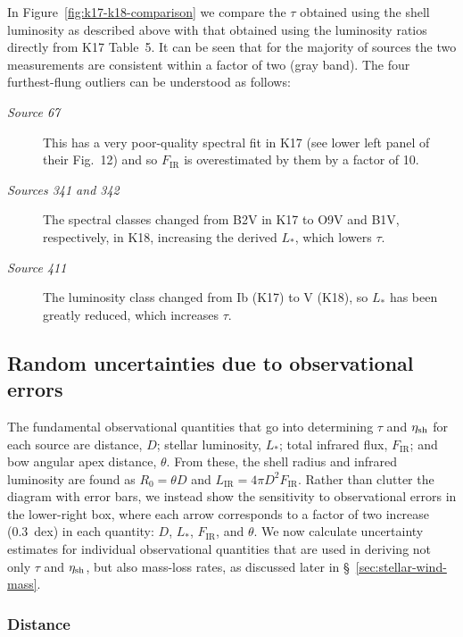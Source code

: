 In Figure~\ref{fig:k17-k18-comparison} we compare the \(\tau\) obtained
using the shell luminosity as described above with that obtained using
the luminosity ratios directly from K17 Table~5.  It can be seen that
for the majority of sources the two measurements are consistent within
a factor of two (gray band).  The four furthest-flung outliers can be
understood as follows:
\begin{description}
\item[\textit{Source 67}] This has a very poor-quality spectral fit in
  K17 (see lower left panel of their Fig.~12) and so 
  \(F_{\text{IR}}\) is overestimated by them by a factor of 10.
\item[\textit{Sources 341 and 342}] The spectral classes changed from
  B2V in K17 to O9V and B1V, respectively, in K18, increasing the
  derived \(L_*\), which lowers \(\tau\).
\item[\textit{Source 411}] The luminosity class changed from Ib (K17)
  to V (K18), so \(L_*\) has been greatly reduced, which increases
  \(\tau\).
\end{description}


\subsection{Random uncertainties due to observational errors}
\label{sec:rand-syst-uncert}

The fundamental observational quantities that go into determining
\(\tau\) and \(\eta_{\text{sh}}\) for each source are distance, \(D\); stellar
luminosity, \(L_*\); total infrared flux, \(F_{\text{IR}}\); and bow
angular apex distance, \(\theta\).  From these, the shell radius and
infrared luminosity are found as \(R_0 = \theta D\) and
\(L_{\text{IR}} = 4\pi D^2 F_{\text{IR}}\).  Rather than clutter the
diagram with error bars, we instead show the sensitivity to
observational errors in the lower-right box, where each arrow
corresponds to a factor of two increase (0.3~dex) in each quantity:
\(D\), \(L_*\), \(F_{\text{IR}}\), and \(\theta\).  We now calculate
uncertainty estimates for individual observational quantities that are
used in deriving not only \(\tau\) and \(\eta_{\text{sh}}\), but also mass-loss
rates, as discussed later in \S~\ref{sec:stellar-wind-mass}.

\subsubsection{Distance}
\label{sec:distance}

